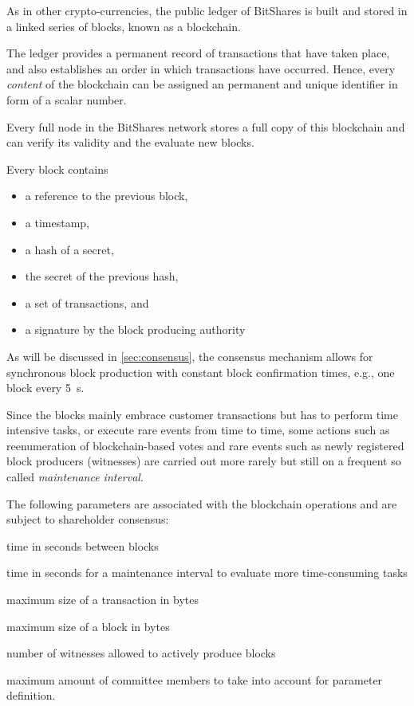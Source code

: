 \newcommand*\justify{%
  \fontdimen2\font=0.4em%
  \fontdimen3\font=0.2em%
  \fontdimen4\font=0.1em%
  \fontdimen7\font=0.1em%
  \hyphenchar\font=`\-%
}

As in other crypto-currencies, the public ledger of BitShares is built and
stored in a linked series of blocks, known as a blockchain.

The ledger provides a permanent record of transactions that have taken place,
and also establishes an order in which transactions have occurred. Hence, every
\emph{content} of the blockchain can be assigned an permanent and unique
identifier in form of a scalar number.

Every full node in the BitShares network stores a full copy of this blockchain
and can verify its validity and the evaluate new blocks.

Every block contains
\begin{itemize}
 \item a reference to the previous block,
 \item a timestamp,
 \item a hash of a secret,
 \item the secret of the previous hash,
 \item a set of transactions, and
 \item a signature by the block producing authority
\end{itemize}

As will be discussed in \cref{sec:consensus}, the consensus mechanism allows
for synchronous block production with constant block confirmation times, e.g.,
one block every \SI{5}{\second}.

Since the blocks mainly embrace customer transactions but has to perform time
intensive tasks, or execute rare events from time to time, some actions such as
reenumeration of blockchain-based votes and rare events such as newly
registered block producers (witnesses) are carried out more rarely but still on
a frequent so called \emph{maintenance interval}.

The following parameters are associated with the blockchain operations and are
subject to shareholder consensus:
%
\begin{description}[leftmargin=4em,style=nextline]
 \item[\texttt{block-interval}] time in seconds between blocks
 \item[\texttt{maintenance-interval}] time in seconds for a maintenance
                                      interval to evaluate more time-consuming tasks
 \item[\texttt{maximum-transaction-size}] maximum size of a transaction in bytes
 \item[\texttt{maximum-block-size}] maximum size of a block in bytes
 \item[\texttt{maximum-witness-count}] number of witnesses allowed to actively
                                       produce blocks
 \item[\texttt{maximum-committee-count}] maximum amount of committee members to
                                         take into account for parameter definition.
\end{description}
